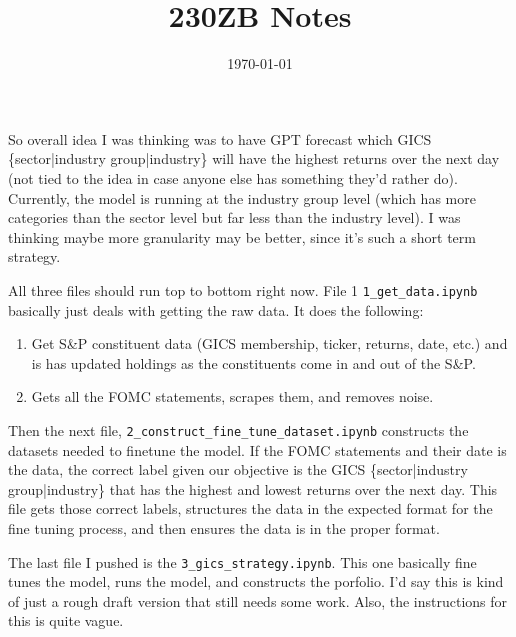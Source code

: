 \documentclass[11pt]{article}
\title{230ZB Notes}
\date{\today}
\begin{document}
\maketitle 


So overall idea I was thinking was to have GPT forecast which GICS \{sector|industry group|industry\} 
will have the highest returns over the next day (not tied to the idea in case anyone else has 
something they'd rather do). Currently, the model is running at the industry group level (which has 
more categories than the sector level but far less than the industry level). I was thinking maybe more 
granularity may be better, since it's such a short term strategy. 


All three files should run top to bottom right now. File 1 \verb|1_get_data.ipynb| basically just deals with 
getting the raw data. It does the following:
\begin{enumerate}
    \item Get S\&P constituent data (GICS membership, ticker, returns, date, etc.) and is has updated 
    holdings as the constituents come in and out of the S\&P.
    \item Gets all the FOMC statements, scrapes them, and removes noise.
\end{enumerate}


Then the next file, \verb|2_construct_fine_tune_dataset.ipynb| constructs the datasets needed 
to finetune the model. If the FOMC statements and their date is the data, the correct label 
given our objective is the GICS \{sector|industry group|industry\} that has the highest and lowest
returns over the next day. This file gets those correct labels, structures the data in the expected 
format for the fine tuning process, and then ensures the data is in the proper format.


The last file I pushed is the \verb|3_gics_strategy.ipynb|. This one basically fine tunes the 
model, runs the model, and constructs the porfolio. I'd say this is kind of 
just a rough draft version that still needs some work. Also, the instructions 
for this is quite vague.
\end{document}
